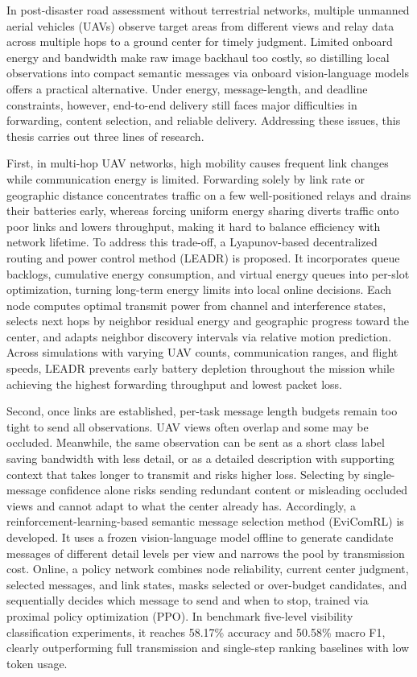 \begin{eabstract}

In post-disaster road assessment without terrestrial networks, multiple unmanned aerial vehicles (UAVs) observe target areas from different views and relay data across multiple hops to a ground center for timely judgment. Limited onboard energy and bandwidth make raw image backhaul too costly, so distilling local observations into compact semantic messages via onboard vision-language models offers a practical alternative. Under energy, message-length, and deadline constraints, however, end-to-end delivery still faces major difficulties in forwarding, content selection, and reliable delivery. Addressing these issues, this thesis carries out three lines of research.

First, in multi-hop UAV networks, high mobility causes frequent link changes while communication energy is limited. Forwarding solely by link rate or geographic distance concentrates traffic on a few well-positioned relays and drains their batteries early, whereas forcing uniform energy sharing diverts traffic onto poor links and lowers throughput, making it hard to balance efficiency with network lifetime. To address this trade-off, a Lyapunov-based decentralized routing and power control method (LEADR) is proposed. It incorporates queue backlogs, cumulative energy consumption, and virtual energy queues into per-slot optimization, turning long-term energy limits into local online decisions. Each node computes optimal transmit power from channel and interference states, selects next hops by neighbor residual energy and geographic progress toward the center, and adapts neighbor discovery intervals via relative motion prediction. Across simulations with varying UAV counts, communication ranges, and flight speeds, LEADR prevents early battery depletion throughout the mission while achieving the highest forwarding throughput and lowest packet loss.

Second, once links are established, per-task message length budgets remain too tight to send all observations. UAV views often overlap and some may be occluded. Meanwhile, the same observation can be sent as a short class label saving bandwidth with less detail, or as a detailed description with supporting context that takes longer to transmit and risks higher loss. Selecting by single-message confidence alone risks sending redundant content or misleading occluded views and cannot adapt to what the center already has. Accordingly, a reinforcement-learning-based semantic message selection method (EviComRL) is developed. It uses a frozen vision-language model offline to generate candidate messages of different detail levels per view and narrows the pool by transmission cost. Online, a policy network combines node reliability, current center judgment, selected messages, and link states, masks selected or over-budget candidates, and sequentially decides which message to send and when to stop, trained via proximal policy optimization (PPO). In benchmark five-level visibility classification experiments, it reaches 58.17\% accuracy and 50.58\% macro F1, clearly outperforming full transmission and single-step ranking baselines with low token usage.


\end{eabstract}
